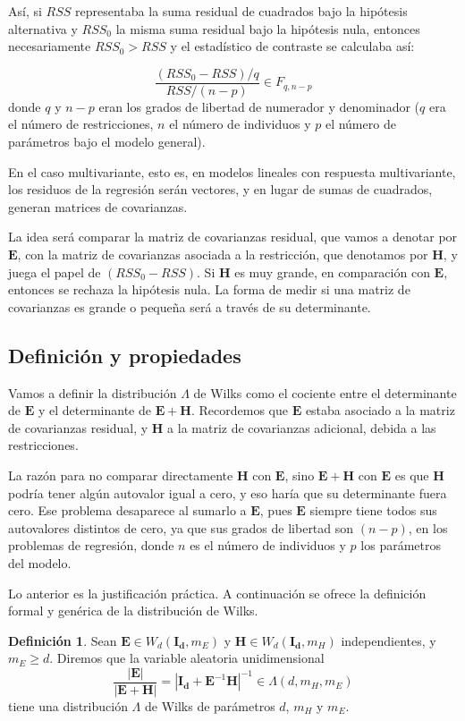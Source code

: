 \documentclass[
  a4paper,
  oneside]{scrbook}
\theoremstyle{definition}
\newtheorem{definition}{Definición}[chapter]
\theoremstyle{definition}
\theoremstyle{definition}
\theoremstyle{definition}
\theoremstyle{remark}
\begin{document}
Así, si \(RSS\) representaba la suma residual de cuadrados bajo la
hipótesis alternativa y \(RSS_0\) la misma suma residual bajo la hipótesis
nula, entonces necesariamente \(RSS_0>RSS\) y el estadístico de contraste
se calculaba así:

\[\frac{(RSS_0-RSS)/q}{RSS/(n-p)}\in F_{q,n-p}\] donde
\(q\) y \(n-p\) eran los grados de libertad de numerador y denominador (\(q\)
era el número de restricciones, \(n\) el número de individuos y \(p\) el
número de parámetros bajo el modelo general).

En el caso multivariante, esto es, en modelos lineales con respuesta
multivariante, los residuos de la regresión serán vectores, y en lugar
de sumas de cuadrados, generan matrices de covarianzas.

La idea será comparar la matriz de covarianzas residual, que vamos a
denotar por \(\bm{E}\), con la matriz de covarianzas asociada a la
restricción, que denotamos por \(\bm{H}\), y juega el papel de
\((RSS_0-RSS)\). Si \(\bm{H}\) es muy grande, en comparación con \(\bm{E}\),
entonces se rechaza la hipótesis nula. La forma de medir si una matriz
de covarianzas es grande o pequeña será a través de su determinante.

\subsection{Definición y propiedades}\label{definicion-y-propiedades-3}

Vamos a definir la distribución \(\Lambda\) de Wilks como el cociente
entre el determinante de \(\bm{E}\) y el determinante de \(\bm{E}+\bm{H}\).
Recordemos que \(\bm{E}\) estaba asociado a la matriz de covarianzas
residual, y \(\bm{H}\) a la matriz de covarianzas adicional, debida a las
restricciones.

La razón para no comparar directamente \(\bm{H}\) con \(\bm{E}\), sino
\(\bm{E}+\bm{H}\) con \(\bm{E}\) es que \(\bm{H}\) podría tener algún
autovalor igual a cero, y eso haría que su determinante fuera cero. Ese
problema desaparece al sumarlo a \(\bm{E}\), pues \(\bm{E}\) siempre tiene
todos sus autovalores distintos de cero, ya que sus grados de libertad
son \((n-p)\), en los problemas de regresión, donde \(n\) es el número de
individuos y \(p\) los parámetros del modelo.

Lo anterior es la justificación práctica. A continuación se ofrece la
definición formal y genérica de la distribución de Wilks.

\begin{definition}
\protect\hypertarget{def:unnamed-chunk-111}{}\label{def:unnamed-chunk-111}Sean \(\bm{E}\in W_d(\bm{I_d},m_E)\) y \(\bm{H}\in W_d(\bm{I_d},m_H)\)
independientes, y \(m_E\geq d\). Diremos que la variable aleatoria
unidimensional
\[\frac{|\bm{E}|}{|\bm{E}+\bm{H}|}=\left|\bm{I_d}+\bm{E}^{-1}\bm{H}\right|^{-1} \in \Lambda(d,m_H,m_E)\]
tiene una distribución \(\Lambda\) de Wilks de parámetros \(d\), \(m_H\) y
\(m_E\).
\end{definition}
\end{document}
